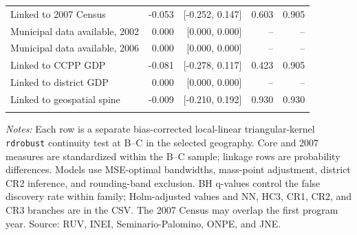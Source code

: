 \begin{table}[!htbp]
\begin{tabular}{lrrrr}
Linked to 2007 Census & -0.053 & [-0.252, 0.147] & 0.603 & 0.905 \\
Municipal data available, 2002 & 0.000 & [0.000, 0.000] & -- & -- \\
Municipal data available, 2006 & 0.000 & [0.000, 0.000] & -- & -- \\
Linked to CCPP GDP & -0.081 & [-0.278, 0.117] & 0.423 & 0.905 \\
Linked to district GDP & 0.000 & [0.000, 0.000] & -- & -- \\
Linked to geospatial spine & -0.009 & [-0.210, 0.192] & 0.930 & 0.930 \\
\addlinespace
\bottomrule
\end{tabular}
\parbox{0.97\linewidth}{\footnotesize \textit{Notes:} Each row is a separate bias-corrected local-linear triangular-kernel \texttt{rdrobust} continuity test at B--C in the selected geography. Core and 2007 measures are standardized within the B--C sample; linkage rows are probability differences. Models use MSE-optimal bandwidths, mass-point adjustment, district CR2 inference, and rounding-band exclusion. BH q-values control the false discovery rate within family; Holm-adjusted values and NN, HC3, CR1, CR2, and CR3 branches are in the CSV. The 2007 Census may overlap the first program year. Source: RUV, INEI, Seminario-Palomino, ONPE, and JNE.}
\end{table}
